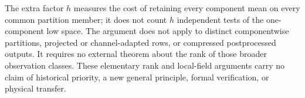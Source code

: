 The extra factor $h$ measures the cost of retaining every component mean
on every common partition member; it does not count $h$ independent tests
of the one-component low space. The argument does not apply to distinct
componentwise partitions, projected or channel-adapted rows, or compressed
postprocessed outputs. It requires no external theorem about the rank of
those broader observation classes. These elementary rank and local-field
arguments carry no claim of historical priority, a new general principle,
formal verification, or physical transfer.
